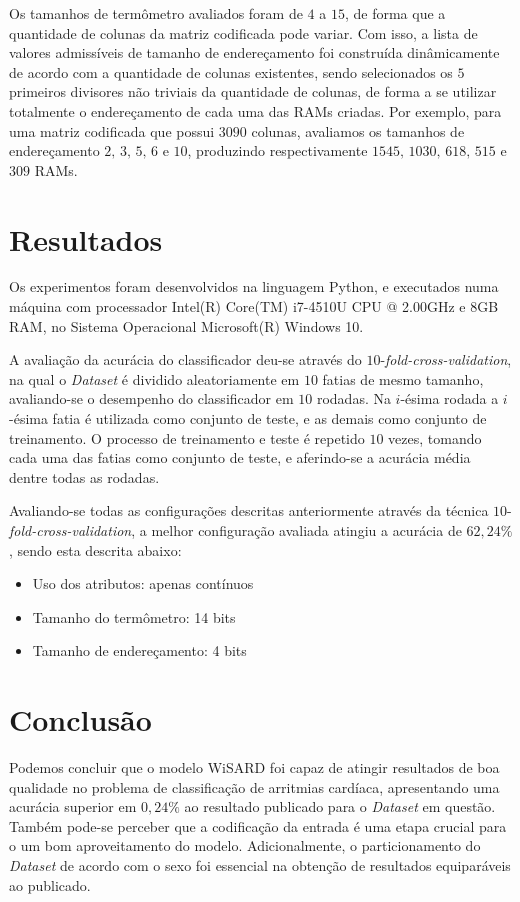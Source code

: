 \documentclass[12pt]{article}
\begin{document}
Os tamanhos de termômetro avaliados foram de $4$ a $15$, de forma que a quantidade de colunas da matriz codificada pode variar. Com isso, a lista de valores admissíveis de tamanho de endereçamento foi construída dinâmicamente de acordo com a quantidade de colunas existentes, sendo selecionados os $5$ primeiros divisores não triviais da quantidade de colunas, de forma a se utilizar totalmente o endereçamento de cada uma das RAMs criadas. Por exemplo, para uma matriz codificada que possui $3090$ colunas, avaliamos os tamanhos de endereçamento $2,\,3,\,5,\,6$ e $10$, produzindo respectivamente $1545,\,1030,\,618,\,515$ e $309$ RAMs.

\section{Resultados} \label{sec:resultados}

Os experimentos foram desenvolvidos na linguagem Python, e executados numa máquina com processador Intel(R) Core(TM) i7-4510U CPU @ 2.00GHz e $8$GB RAM, no Sistema Operacional Microsoft(R) Windows 10.

A avaliação da acurácia do classificador deu-se através do $10$-\emph{fold-cross-validation}, na qual o \emph{Dataset} é dividido aleatoriamente em $10$ fatias de mesmo tamanho, avaliando-se o desempenho do classificador em $10$ rodadas. Na $i$-ésima rodada a $i$-ésima fatia é utilizada como conjunto de teste, e as demais como conjunto de treinamento. O processo de treinamento e teste é repetido $10$ vezes, tomando cada uma das fatias como conjunto de teste, e aferindo-se a acurácia média dentre todas as rodadas.

Avaliando-se todas as configurações descritas anteriormente através da técnica $10$-\emph{fold-cross-validation}, a melhor configuração avaliada atingiu a acurácia de $62,24\%$, sendo esta descrita abaixo:

\begin{itemize}
 \item Uso dos atributos: apenas contínuos
 \item Tamanho do termômetro: 14 bits
 \item Tamanho de endereçamento: 4 bits
\end{itemize}

\section{Conclusão}\label{sec:conclusao}

Podemos concluir que o modelo WiSARD foi capaz de atingir resultados de boa qualidade no problema de classificação de arritmias cardíaca, apresentando uma acurácia superior em $0,24\%$ ao resultado publicado para o \emph{Dataset} em questão. Também pode-se perceber que a codificação da entrada é uma etapa crucial para o um bom aproveitamento do modelo. Adicionalmente, o particionamento do \emph{Dataset} de acordo com o sexo foi essencial na obtenção de resultados equiparáveis ao publicado.



\end{document}
